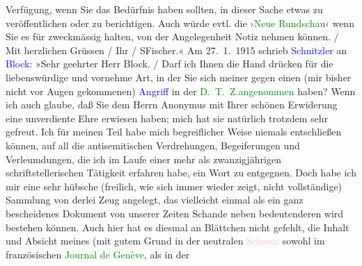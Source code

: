 {{{                        Verfügung, wenn Sie das Bedürfnis haben sollten, in dieser Sache etwas zu
                        veröffentlichen oder zu berichtigen. Auch würde evtl. die ›\textcolor{green}{Neue Rundschau}‹ wenn Sie es für zweckmässig halten,
                        von der Angelegenheit Notiz nehmen können.{ / }Mit herzlichen Grüssen{ / }Ihr{ / }SFischer.« Am 27. 1. 1915 schrieb \textcolor{blue}{Schnitzler} an \textcolor{blue}{Block}:
                        »Sehr geehrter Herr Block.{ / }Darf ich Ihnen die Hand drücken für die liebenswürdige und vornehme Art, in
                        der Sie sich meiner gegen einen (mir bisher nicht vor Augen gekommenen) \textcolor{blue}{Angriff} in der \textcolor{green}{D. T. Z.}\textcolor{green}{angenommen} haben?
                        Wenn ich auch glaube, daß Sie dem Herrn Anonymus mit Ihrer schönen
                        Erwiderung eine unverdiente Ehre erwiesen haben; mich hat sie natürlich
                        trotzdem sehr gefreut. Ich für meinen Teil habe mich begreiflicher Weise
                        niemals entschließen können, auf all die antisemitischen Verdrehungen,
                        Begeiferungen und Verleumdungen, die ich im Laufe einer mehr als
                        zwanzigjährigen schriftstellerischen Tätigkeit erfahren habe, ein Wort zu
                        entgegnen. Doch habe ich mir eine sehr hübsche (freilich, wie sich immer
                        wieder zeigt, nicht vollständige) Sammlung von derlei Zeug angelegt, das
                        vielleicht einmal als ein ganz bescheidenes Dokument von unserer Zeiten
                        Schande neben bedeutenderen wird bestehen können. Auch hier hat es diesmal
                        an Blättchen nicht gefehlt, die Inhalt und Absicht meines (mit gutem Grund
                        in der neutralen \textcolor{pink}{Schweiz} sowohl im
                        französischen \textcolor{green}{Journal de Genève}, als in der
}}}
